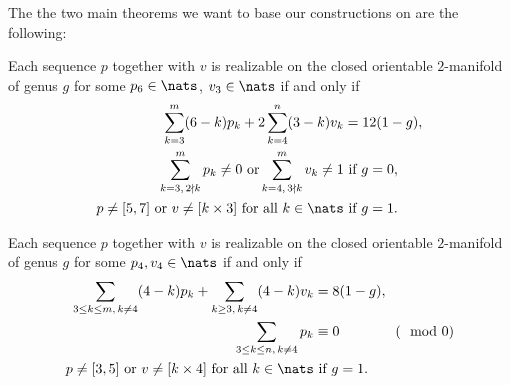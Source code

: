 The the two main theorems we want to base our constructions on are the following:

\begin{theorem} \label{thm:eberhard:extended:3}
   Each sequence $p$ together with $v$ is realizable on the closed orientable $2$-manifold of genus $g$ for some $p_6 \in \nats$, $v_3 \in \nats$ if and only if
  \begin{align*}
    \sum_{k=3}^m (6-k)p_k + 2 \sum_{k=4}^n (3-k)v_k &= 12(1-g), \\
    \sum_{k=3,\, 2 \nmid k}^{m} p_k \neq 0 \text{ or} \sum_{k=4, \,3 \nmid k}^m v_k \neq 1 &\text{ if } g = 0, \\
    p \neq [5, 7] \text{ or } v \neq [k\times3] \text{ for all } k \in \nats &\text{ if } g = 1.
  \end{align*}
\end{theorem}

\begin{theorem} \label{thm:eberhard:extended:4}
   Each sequence $p$ together with $v$ is realizable on the closed orientable $2$-manifold of genus $g$ for some $p_4, v_4 \in \nats$ if and only if
  \begin{align*}
    \sum_{3 \leq k \leq m,\, k \neq 4} (4-k)p_k + \sum_{k \geq 3,\, k\neq 4} (4-k)v_k &= 8(1-g), \\
    \sum_{3 \leq k \leq n,\, k \neq 4} p_k &\equiv 0 \qquad\qquad (\mod 0) \\
    p \neq [3, 5] \text{ or } v \neq [k\times4] \text{ for all } k \in \nats &\text{ if } g = 1.
  \end{align*}
\end{theorem}
